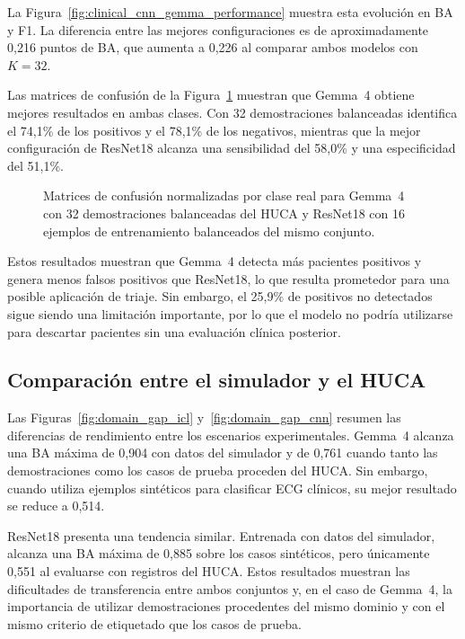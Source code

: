La Figura~\ref{fig:clinical_cnn_gemma_performance} muestra esta evolución en BA y F1. La diferencia entre las mejores configuraciones es de aproximadamente 0,216 puntos de BA, que aumenta a 0,226 al comparar ambos modelos con \(K=32\).

Las matrices de confusión de la Figura~\ref{fig:clinical_cnn_gemma_confusions} muestran que Gemma~4 obtiene mejores resultados en ambas clases. Con 32 demostraciones balanceadas identifica el 74,1\% de los positivos y el 78,1\% de los negativos, mientras que la mejor configuración de ResNet18 alcanza una sensibilidad del 58,0\% y una especificidad del 51,1\%.

\begin{figure}[H]
  \centering
  \caption{Matrices de confusión normalizadas por clase real para Gemma~4 con 32 demostraciones balanceadas del HUCA y ResNet18 con 16 ejemplos de entrenamiento balanceados del mismo conjunto.}
  \label{fig:clinical_cnn_gemma_confusions}
\end{figure}

Estos resultados muestran que Gemma~4 detecta más pacientes positivos y genera menos falsos positivos que ResNet18, lo que resulta prometedor para una posible aplicación de triaje. Sin embargo, el 25,9\% de positivos no detectados sigue siendo una limitación importante, por lo que el modelo no podría utilizarse para descartar pacientes sin una evaluación clínica posterior.

\subsection{Comparación entre el simulador y el HUCA}

Las Figuras~\ref{fig:domain_gap_icl} y~\ref{fig:domain_gap_cnn} resumen las diferencias de rendimiento entre los escenarios experimentales. Gemma~4 alcanza una BA máxima de 0,904 con datos del simulador y de 0,761 cuando tanto las demostraciones como los casos de prueba proceden del HUCA. Sin embargo, cuando utiliza ejemplos sintéticos para clasificar ECG clínicos, su mejor resultado se reduce a 0,514.

ResNet18 presenta una tendencia similar. Entrenada con datos del simulador, alcanza una BA máxima de 0,885 sobre los casos sintéticos, pero únicamente 0,551 al evaluarse con registros del HUCA. Estos resultados muestran las dificultades de transferencia entre ambos conjuntos y, en el caso de Gemma~4, la importancia de utilizar demostraciones procedentes del mismo dominio y con el mismo criterio de etiquetado que los casos de prueba.

